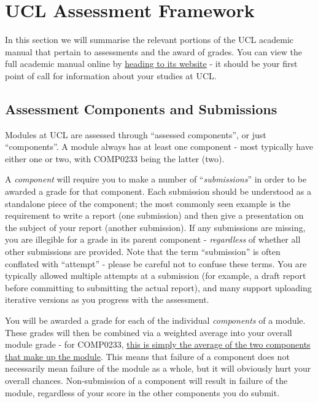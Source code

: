 \section{UCL Assessment Framework}

In this section we will summarise the relevant portions of the UCL academic manual that pertain to assessments and the award of grades.
You can view the full academic manual online by \href{https://www.ucl.ac.uk/study/current-students/academic-manual}{heading to its website} - it should be your first point of call for information about your studies at UCL.

\subsection{Assessment Components and Submissions}

Modules at UCL are assessed through ``assessed components'', or just ``components''.
A module always has at least one component - most typically have either one or two, with COMP0233 being the latter (two).

A \emph{component} will require you to make a number of ``\emph{submissions}'' in order to be awarded a grade for that component.
Each submission should be understood as a standalone piece of the component; the most commonly seen example is the requirement to write a report (one submission) and then give a presentation on the subject of your report (another submission).
If any submissions are missing, you are illegible for a grade in its parent component - \emph{regardless} of whether all other submissions are provided.
Note that the term ``submission'' is often conflated with ``attempt'' - please be careful not to confuse these terms.
You are typically allowed multiple attempts at a submission (for example, a draft report before committing to submitting the actual report), and many support uploading iterative versions as you progress with the assessment.

You will be awarded a grade for each of the individual \emph{components} of a module.
These grades will then be combined via a weighted average into your overall module grade - for COMP0233, \hyperref[sec:tldr]{this is simply the average of the two components that make up the module}.
This means that failure of a component does not necessarily mean failure of the module as a whole, but it will obviously hurt your overall chances.
Non-submission of a component will result in failure of the module, regardless of your score in the other components you do submit.

